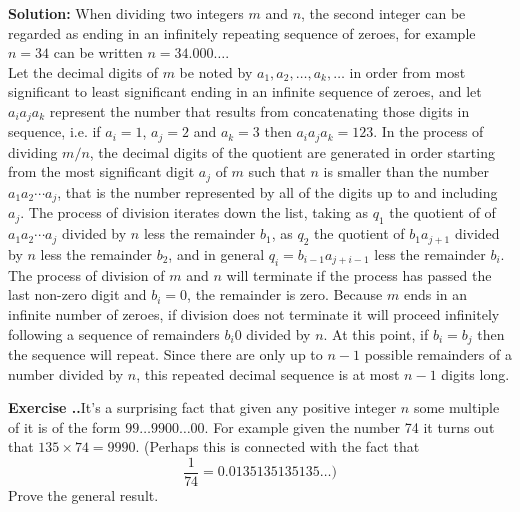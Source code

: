 \documentclass{article}
\newcounter{chapter}[section] %
\newcounter{example}[chapter]
\newcommand{\solution}[1]{\setlength{\hangindent}{\parindent} \indent\indent \textbf{Solution: }#1\hfill\break}
\newcommand{\exercise}[1]{
	
	\refstepcounter{example}
    \hangafter=1
    \setlength{\hangindent}{ 
    	\widthof{
			\large\textbf{Exercise \thesection.\thechapter.\theexample\enspace}
    	}-.5\parindent
    }
    {\setlength{\parindent}{0in}\large\textbf{Exercise \thesection.\thechapter.\theexample\enspace}#1}\hfill\break\par
}
\begin{document}
\solution{When dividing two integers $m$ and $n$, the second integer can be regarded as ending in an infinitely repeating sequence of zeroes, for example $n=34$ can be written $n=34.000\dots$. \\ \indent Let the decimal digits of $m$ be noted by $a_1, a_2, \dots, a_k, \dots$ in order from most significant to least significant ending in an infinite sequence of zeroes, and let $a_ia_ja_k$ represent the number that results from concatenating those digits in sequence, i.e. if $a_i = 1$, $a_j=2$ and $a_k=3$ then $a_ia_ja_k = 123$. In the process of dividing $m/n$, the decimal digits of the quotient are generated in order starting from the most significant digit $a_j$ of $m$ such that $n$ is smaller than the number $a_1a_2\dotsb a_j$, that is the number represented by all of the digits up to and including $a_j$. The process of division iterates down the list, taking as $q_1$ the quotient of of $a_1a_2\dotsb a_j$ divided by $n$ less the remainder $b_1$, as $q_2$ the quotient of $b_1a_{j+1}$ divided by $n$ less the remainder $b_2$, and in general $q_i = b_{i-1}a_{j+i-1}$ less the remainder $b_i$. \\ \indent The process of division of $m$ and $n$ will terminate if the process has passed the last non-zero digit and $b_i=0$, the remainder is zero. Because $m$ ends in an infinite number of zeroes, if division does not terminate  it will proceed infinitely following a sequence of remainders $b_i0$ divided by $n$. At this point, if $b_i = b_j$ then the sequence will repeat. Since there are only up to $n-1$ possible remainders of a number divided by $n$, this repeated decimal sequence is at most $n-1$ digits long.}
\exercise{It's a surprising fact that given any positive integer $n$ some multiple of it is of the form $99\dots 9900\dots 00$. For example given the number 74 it turns out that $135\times 74 = 9990$. (Perhaps this is connected with the fact that $$\frac{1}{74} = 0.0135135135135\dots)$$ Prove the general result.} %
\end{document}
